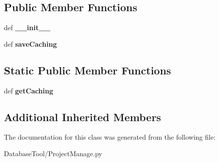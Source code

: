\subsection*{Public Member Functions}
\begin{DoxyCompactItemize}
\item 
\mbox{\label{classMIS_1_1DatabaseTool_1_1ProjectManage_1_1Cormis__DataReader__hdf_a92fdb65f3d58109715a18822514620a1}} 
def {\bfseries \+\_\+\+\_\+init\+\_\+\+\_\+}
\item 
\mbox{\label{classMIS_1_1DatabaseTool_1_1ProjectManage_1_1Cormis__DataReader__hdf_a6f81c9f594cb02c1abb5d19a2fbe2f4a}} 
def {\bfseries save\+Caching}
\end{DoxyCompactItemize}
\subsection*{Static Public Member Functions}
\begin{DoxyCompactItemize}
\item 
\mbox{\label{classMIS_1_1DatabaseTool_1_1ProjectManage_1_1Cormis__DataReader__hdf_a7217c9e762f5ecae0c1d1d4ba9242524}} 
def {\bfseries get\+Caching}
\end{DoxyCompactItemize}
\subsection*{Additional Inherited Members}


The documentation for this class was generated from the following file\+:\begin{DoxyCompactItemize}
\item 
Database\+Tool/Project\+Manage.\+py\end{DoxyCompactItemize}

